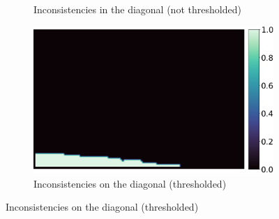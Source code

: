 \documentclass{ipol}
\begin{document}
\begin{figure}[ht]
\begin{subfigure}[t]{.245\linewidth}
                \caption{Inconsistencies in the diagonal (not thresholded)}
        \end{subfigure}\hfill%
        \begin{subfigure}[t]{.245\linewidth}
                \includegraphics[width=\linewidth]{images/forged_house/out_inconsistent_diag_thr_fig.png}
                \caption{Inconsistencies on the diagonal (thresholded)}
        \end{subfigure}


\end{figure}
\end{document}
